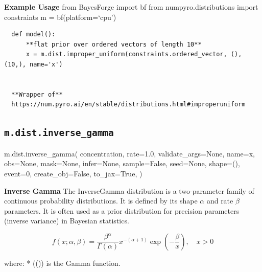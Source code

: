 \documentclass[
  letterpaper,
  DIV=11,
  numbers=noendperiod]{scrartcl}
\newenvironment{Shaded}{\begin{snugshade}}{\end{snugshade}}
\newcommand{\DecValTok}[1]{\textcolor[rgb]{0.68,0.00,0.00}{#1}}
\newcommand{\FloatTok}[1]{\textcolor[rgb]{0.68,0.00,0.00}{#1}}
\newcommand{\NormalTok}[1]{\textcolor[rgb]{0.00,0.23,0.31}{#1}}
\newcommand{\OperatorTok}[1]{\textcolor[rgb]{0.37,0.37,0.37}{#1}}
\newcommand{\StringTok}[1]{\textcolor[rgb]{0.13,0.47,0.30}{#1}}
\newcommand{\VariableTok}[1]{\textcolor[rgb]{0.07,0.07,0.07}{#1}}
\begin{document}
\textbf{Example Usage} from BayesForge import bf from
numpyro.distributions import constraints m = bf(platform=`cpu')

\begin{verbatim}
  def model():
      **flat prior over ordered vectors of length 10**
      x = m.dist.improper_uniform(constraints.ordered_vector, (), (10,), name='x')


  **Wrapper of**
  https://num.pyro.ai/en/stable/distributions.html#improperuniform
\end{verbatim}

\subsection{\texorpdfstring{\texttt{m.dist.inverse\_gamma}}{m.dist.inverse\_gamma}}\label{inverse_gamma}

\begin{Shaded}
\begin{Highlighting}[]
\NormalTok{m.dist.inverse\_gamma(}
\NormalTok{    concentration,}
\NormalTok{    rate}\OperatorTok{=}\FloatTok{1.0}\NormalTok{,}
\NormalTok{    validate\_args}\OperatorTok{=}\VariableTok{None}\NormalTok{,}
\NormalTok{    name}\OperatorTok{=}\StringTok{\textquotesingle{}x\textquotesingle{}}\NormalTok{,}
\NormalTok{    obs}\OperatorTok{=}\VariableTok{None}\NormalTok{,}
\NormalTok{    mask}\OperatorTok{=}\VariableTok{None}\NormalTok{,}
\NormalTok{    infer}\OperatorTok{=}\VariableTok{None}\NormalTok{,}
\NormalTok{    sample}\OperatorTok{=}\VariableTok{False}\NormalTok{,}
\NormalTok{    seed}\OperatorTok{=}\VariableTok{None}\NormalTok{,}
\NormalTok{    shape}\OperatorTok{=}\NormalTok{(),}
\NormalTok{    event}\OperatorTok{=}\DecValTok{0}\NormalTok{,}
\NormalTok{    create\_obj}\OperatorTok{=}\VariableTok{False}\NormalTok{,}
\NormalTok{    to\_jax}\OperatorTok{=}\VariableTok{True}\NormalTok{,}
\NormalTok{)}
\end{Highlighting}
\end{Shaded}

\textbf{Inverse Gamma} The InverseGamma distribution is a two-parameter
family of continuous probability distributions. It is defined by its
shape \(\alpha\) and rate \(\beta\) parameters. It is often used as a
prior distribution for precision parameters (inverse variance) in
Bayesian statistics.

\[
  f(x; \alpha, \beta) = \frac{\beta^\alpha}{\Gamma(\alpha)} x^{-(\alpha + 1)} \exp\left(-\frac{\beta}{x}\right), \quad x > 0
  \]

where: * (\Gamma(\alpha)) is the Gamma function.
\end{document}

